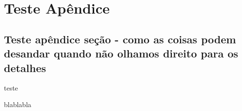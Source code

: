 \apendice

\chapter{Teste Apêndice}
\section{Teste apêndice seção - como as coisas podem desandar quando não olhamos direito para os detalhes}
teste

blablabla